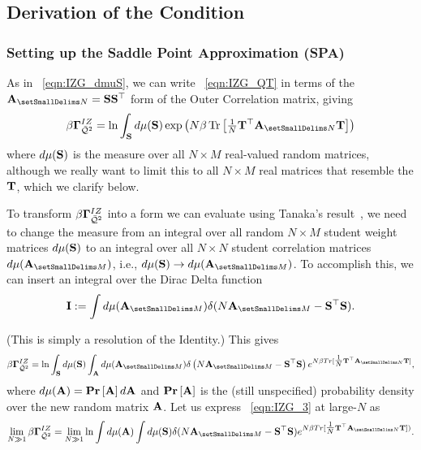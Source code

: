 \subsection{Derivation of the \TRACELOG Condition}
\label{sxn:TraceLogDerivation}


\subsubsection{Setting up the Saddle Point Approximation (SPA)}
\label{sxn:TraceLogDerivation_A}
As in \EQN~\ref{eqn:IZG_dmuS}, 
we can write \EQN~\ref{eqn:IZG_QT} in terms of the $\AMATN = \SMAT\SMAT^{\top}$ form of the Outer \Student Correlation matrix, giving
\begin{align}
\IZG = \ln\INTS d\mu(\SMAT) \exp\left(N\beta \Trace{ \tfrac{1}{N}\TMAT^{\top}\AMATN \TMAT } \right)
\end{align}
where $d\mu({\mathbf{S}})$ is the measure over all $N \times M$ real-valued random matrices,
although we really want to limit this to all $N \times M$ real matrices that resemble the \Teacher ${\mathbf{T}}$,
which we clarify below.

To transform $\beta\mathbf{\Gamma}^{IZ}_{\bar{\mathcal{Q}}^{2}}$ into a form we can evaluate using Tanaka's result~\cite{Tanaka2008}, 
we need to change the measure from an integral over all random $N \times M$ student weight matrices
$d\mu({\mathbf{S}})$ to an integral over all $N \times N$
student correlation matrices $d\mu(\AMATM)$, i.e., $d\mu(\SMAT)\rightarrow d\mu(\AMATM)$.
To accomplish this, we can insert an integral over the Dirac Delta function
\begin{align}
  \label{eqn:I}
  \mathbf{I}:=
  \int d\mu(\AMATM)\delta(N\AMATM-\SMAT^{\top}\SMAT).
\end{align}

\noindent
(This is simply a resolution of the Identity.) This gives
\begin{align}
\label{eqn:IZG_3}
\IZG= \ln \INTS d\mu(\SMAT)\INTA d\mu(\AMATM)
           \delta\left( N\AMATM-\SMAT^{\top}\SMAT \right) 
           e^{ N\beta Tr[\tfrac{1}{N} \TMAT^{\top} \AMATN\TMAT ] } ,
\end{align}
 where $d\mu(\mathbf{A})=\mbox{}{\bf{Pr}}\left[\mathbf{A}\right]d\mathbf{A}$ and $\mbox{}{\bf{Pr}}\left[\mathbf{A}\right]$ is the
(still unspecified) probability density over the new random matrix $\mathbf{A}$. 
%
Let us express \EQN~\ref{eqn:IZG_3} at large-$N$ as
\begin{align}
  \label{eqn:IZG_4}
  \lim_{N\gg 1}\IZG =
  \lim_{N\gg 1}\ln
  \int d\mu(\AMAT)
  \int d\mu(\SMAT)
  \delta(N\AMATM-\SMAT^{\top}\SMAT)
  e^{ N\beta Tr[ \tfrac{1}{N}\TMAT^{\top}\AMATN\TMAT]) }  .
\end{align}
 
